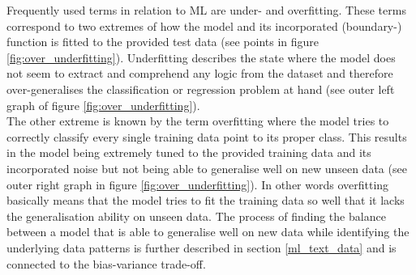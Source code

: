 Frequently used terms in relation to ML are under- and overfitting. These terms correspond to two extremes of how the model and its incorporated (boundary-) function is fitted to the provided test data (see points in figure \ref{fig:over_underfitting}). Underfitting describes the state where the model does not seem to extract and comprehend any logic from the dataset and therefore over-generalises the classification or regression problem at hand (see outer left graph of figure \ref{fig:over_underfitting}). \\
The other extreme is known by the term overfitting where the model tries to correctly classify every single training data point to its proper class. This results in the model being extremely tuned to the provided training data and its incorporated noise but not being able to generalise well on new unseen data (see outer right graph in figure \ref{fig:over_underfitting}). In other words overfitting basically means that the model tries to fit the training data so well that it lacks the generalisation ability on unseen data. The process of finding the balance between a model that is able to generalise well on new data while identifying the underlying data patterns is further described in section \ref{ml_text_data} and is connected to the bias-variance trade-off.